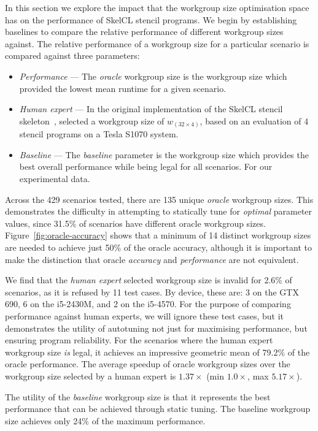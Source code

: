 \documentclass[nonatbib,preprint,9pt]{sigplanconf}
\begin{document}
In this section we explore the impact that the workgroup size
optimisation space has on the performance of SkelCL stencil
programs. We begin by establishing baselines to compare the relative
performance of different workgroup sizes against. The relative
performance of a workgroup size for a particular scenario is compared
against three parameters:
%
\begin{itemize}
\item \emph{Performance} --- The \emph{oracle} workgroup size is the
  workgroup size which provided the lowest mean runtime for a given
  scenario.
\item \emph{Human expert} --- In the original implementation of the
  SkelCL stencil skeleton~\cite{Steuwer2014a},
  \citeauthor{Steuwer2014a} selected a workgroup size of
  $w_{(32 \times 4)}$, based on an evaluation of 4 stencil programs on
  a Tesla S1070 system.
\item \emph{Baseline} --- The \emph{baseline} parameter is the
  workgroup size which provides the best overall performance while
  being legal for all scenarios. For our experimental data.
\end{itemize}
%
Across the 429 scenarios tested, there are 135 unique \emph{oracle}
workgroup sizes. This demonstrates the difficulty in attempting to
statically tune for \emph{optimal} parameter values, since 31.5\% of
scenarios have different oracle workgroup
sizes. Figure~\ref{fig:oracle-accuracy} shows that a minimum of 14
distinct workgroup sizes are needed to achieve just 50\% of the oracle
accuracy, although it is important to make the distinction that oracle
\emph{accuracy} and \emph{performance} are not equivalent.

We find that the \emph{human expert} selected workgroup size is
invalid for 2.6\% of scenarios, as it is refused by 11 test cases. By
device, these are: 3 on the GTX 690, 6 on the i5-2430M, and 2 on the
i5-4570. For the purpose of comparing performance against human
experts, we will ignore these test cases, but it demonstrates the
utility of autotuning not just for maximising performance, but
ensuring program reliability. For the scenarios where the human expert
workgroup size \emph{is} legal, it achieves an impressive geometric
mean of 79.2\% of the oracle performance. The average speedup of
oracle workgroup sizes over the workgroup size selected by a human
expert is $1.37\times$ (min $1.0\times$, max $5.17\times$).

The utility of the \emph{baseline} workgroup size is that it
represents the best performance that can be achieved through static
tuning. The baseline workgroup size achieves only 24\% of the maximum
performance.
\end{document}
